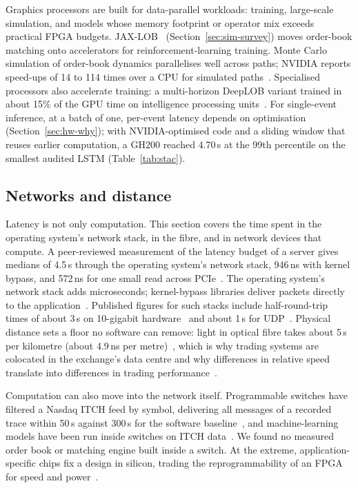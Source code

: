 Graphics processors are built for data-parallel workloads: training, large-scale simulation, and models
whose memory footprint or operator mix exceeds practical FPGA budgets. JAX-LOB~\citep{frey2023}
(Section~\ref{sec:sim-survey}) moves order-book matching onto accelerators for reinforcement-learning training. Monte Carlo simulation
of order-book dynamics parallelises well across paths; NVIDIA reports speed-ups of 14 to 114 times over a CPU for
simulated paths~\citep{nvidia_numba2025}. Specialised processors also accelerate training: a multi-horizon
DeepLOB variant trained in about 15\% of the GPU time on intelligence processing
units~\citep{zhangzohren2021}. For single-event inference, at a batch of one, per-event latency depends on optimisation
(Section~\ref{sec:hw-why}); with NVIDIA-optimised code and a sliding window that reuses earlier computation, a GH200 reached 4.70\,\textmu s
at the 99th percentile on the smallest audited LSTM (Table~\ref{tab:stac}).

\subsection{Networks and distance}

Latency is not only computation. This section covers the time spent in the operating system's network stack, in
the fibre, and in network devices that compute. A peer-reviewed measurement of the latency budget of a server gives medians of
4.5\,\textmu s through the operating system's network stack, 946\,ns with kernel bypass, and 572\,ns for one small
read across PCIe~\citep{zilberman2017where}. The operating system's network stack adds microseconds;
kernel-bypass libraries deliver packets directly to the application~\citep{dpdk}. Published figures for
such stacks include half-round-trip times of about 3\,\textmu s on 10-gigabit
hardware~\citep{openonload} and about 1\,\textmu s for UDP~\citep{vma}. Physical distance sets a floor no
software can remove: light in optical fibre takes about 5\,\textmu s per kilometre (about 4.9\,ns per
metre)~\citep{corning_smf28,fiberlatency}, which is why trading systems are colocated in the
exchange's data centre and why differences in relative speed translate into differences in trading
performance~\citep{baron2019,budish2015}.

Computation can also move into the network itself. Programmable switches have filtered a Nasdaq ITCH feed by
symbol, delivering all messages of a recorded trace within 50\,\textmu s against 300\,\textmu s for the software
baseline~\citep{jepsen2018packet,jepsen2020forwarding}, and machine-learning models have been run inside switches on
ITCH data~\citep{zheng2024planter}. We found no measured order book or matching engine built inside a switch. At the extreme, application-specific chips fix a design in
silicon, trading the reprogrammability of an FPGA for speed and power~\citep{kuon2007}.

